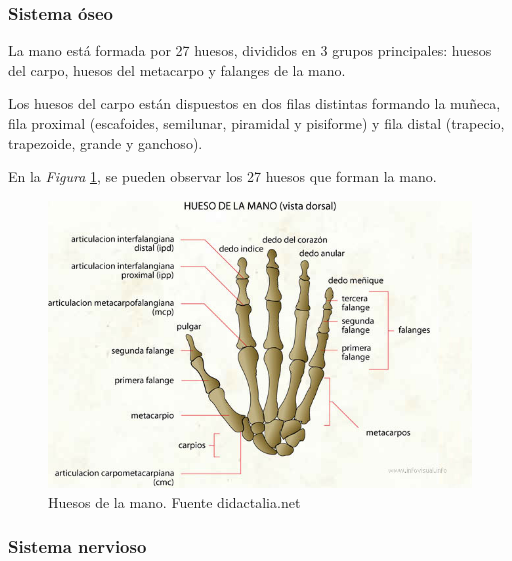 \subsubsection{Sistema óseo}
La mano está formada por 27 huesos, divididos en 3 grupos principales: huesos del carpo, huesos del metacarpo y falanges de la mano.

Los huesos del carpo están dispuestos en dos filas distintas formando la muñeca, fila proximal (escafoides, semilunar, piramidal y pisiforme) y fila distal (trapecio, trapezoide, grande y ganchoso). \cite{mano_anatomía}

En la \textit{Figura} \ref{fig:Huesos_mano}, se pueden observar los 27 huesos que forman la mano.
\begin{figure}
    \centering
    \includegraphics[width=0.6\linewidth]{img/Huesos_mano.png}
    \caption{Huesos de la mano. Fuente didactalia.net}
    \label{fig:Huesos_mano}
\end{figure}
\subsubsection{Sistema nervioso}

